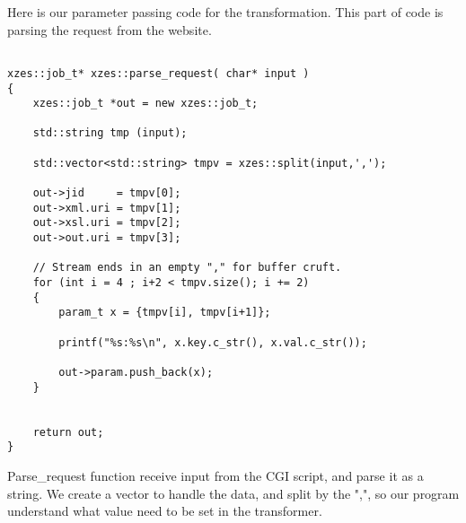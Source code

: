 Here is our parameter passing code for the transformation.
This part of code is parsing the request from the website.
\begin{lstlisting}

xzes::job_t* xzes::parse_request( char* input )
{
    xzes::job_t *out = new xzes::job_t;

    std::string tmp (input);

    std::vector<std::string> tmpv = xzes::split(input,',');

    out->jid     = tmpv[0];
    out->xml.uri = tmpv[1];
    out->xsl.uri = tmpv[2];
    out->out.uri = tmpv[3];

    // Stream ends in an empty "," for buffer cruft.
    for (int i = 4 ; i+2 < tmpv.size(); i += 2)
    {
        param_t x = {tmpv[i], tmpv[i+1]};

        printf("%s:%s\n", x.key.c_str(), x.val.c_str());

        out->param.push_back(x);
    }


    return out;
}

\end{lstlisting}

Parse\_request function receive input from the CGI script, and parse it as a string.
We create a vector to handle the data, and split by the ",", so our program understand what value need to be set in the transformer.
